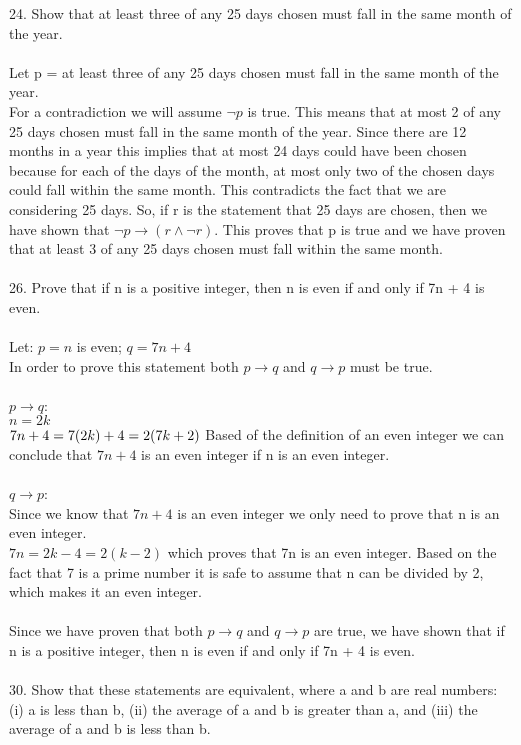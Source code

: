 \documentclass[11pt, oneside]{article}   	%
\begin{document}
24. Show that at least three of any 25 days chosen must fall in the same month of the year.\\\\
Let p = at least three of any 25 days chosen must fall in the same month of the year.\\
For a contradiction we will assume $\neg p$ is true. This means that at most 2 of any 25 days chosen must fall in the same month of the year. Since there are 12 months in a year this implies that at most 24 days could have been chosen because for each of the days of the month, at most only two of the chosen days could fall within the same month. This contradicts the fact that we are considering 25 days. So, if r is the statement that 25 days are chosen, then we have shown that $\neg p\to (r\wedge\neg r)$. This proves that p is true and we have proven that at least 3 of any 25 days chosen must fall within the same month. \\\\
26. Prove that if n is a positive integer, then n is even if and only if 7n + 4 is even.\\\\
Let: $p = n$ is even;  $q = 7n+4$\\
In order to prove this statement both $p\to q$ and $q\to p$ must be true. \\\\
$p\to q$:\\ 
$n = 2k$\\
$7n + 4 = 7(2k) + 4 = 2(7k + 2)\\$
Based of the definition of an even integer we can conclude that $7n + 4$ is an even integer if n is an even integer. \\\\
$q\to p$:\\
Since we know that $7n + 4$ is an even integer we only need to prove that n is an even integer. \\
$7n = 2k - 4 = 2(k - 2)$ which proves that 7n is an even integer. Based on the fact that 7 is a prime number it is safe to assume that n can be divided by 2, which makes it an even integer. \\\\
Since we have proven that both $p\to q$ and $q\to p$ are true, we have shown that if n is a positive integer, then n is even if and only if 7n + 4 is even.\\\\
30. Show that these statements are equivalent, where a and b are real numbers: (i) a is less than b, (ii) the average of a and b is greater than a, and (iii) the average of a and b is less than b.\\
\end{document}
